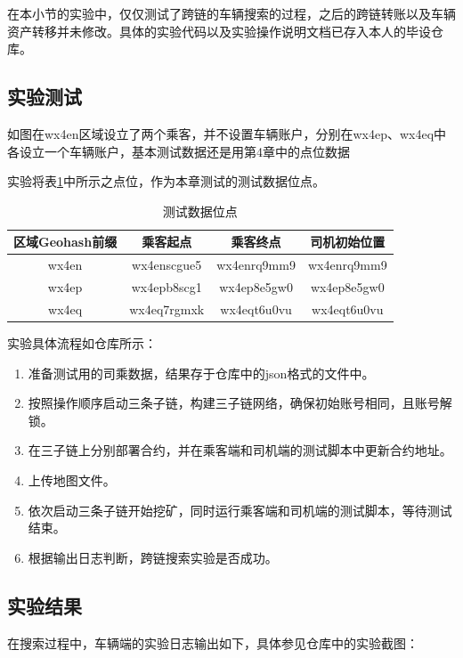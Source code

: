 在本小节的实验中，仅仅测试了跨链的车辆搜索的过程，之后的跨链转账以及车辆资产转移并未修改。具体的实验代码以及实验操作说明文档已存入本人的毕设仓库。

\subsection{实验测试}

如图在wx4en区域设立了两个乘客，并不设置车辆账户，分别在wx4ep、wx4eq中各设立一个车辆账户，基本测试数据还是用第4章中的点位数据

实验将表\ref{测试数据位点}中所示之点位，作为本章测试的测试数据位点。

\begin{table}
    \centering
    \caption{测试数据位点}\label{测试数据位点}
    \begin{tabular}{cccc} \toprule
        区域Geohash前缀 & 乘客起点        & 乘客终点        & 司机初始位置      \\\hline
        wx4en       & wx4enscgue5 & wx4enrq9mm9 & wx4enrq9mm9 \\
        wx4ep       & wx4epb8scg1 & wx4ep8e5gw0 & wx4ep8e5gw0 \\
        wx4eq       & wx4eq7rgmxk & wx4eqt6u0vu & wx4eqt6u0vu \\
        \bottomrule
    \end{tabular}
\end{table}

实验具体流程如仓库所示：

\begin{enumerate}
    \item 准备测试用的司乘数据，结果存于仓库中的json格式的文件中。
    \item 按照操作顺序启动三条子链，构建三子链网络，确保初始账号相同，且账号解锁。
    \item 在三子链上分别部署合约，并在乘客端和司机端的测试脚本中更新合约地址。
    \item 上传地图文件。
    \item 依次启动三条子链开始挖矿，同时运行乘客端和司机端的测试脚本，等待测试结束。
    \item 根据输出日志判断，跨链搜索实验是否成功。
\end{enumerate}

\subsection{实验结果}

在搜索过程中，车辆端的实验日志输出如下，具体参见仓库中的实验截图：

